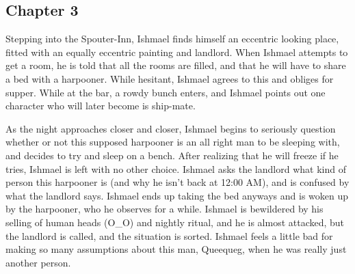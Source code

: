 \subsection{Chapter 3}

Stepping into the Spouter-Inn, Ishmael finds himself an eccentric looking
place, fitted with an equally eccentric painting and landlord. When Ishmael
attempts to get a room, he is told that all the rooms are filled, and that he
will have to share a bed with a harpooner. While hesitant, Ishmael agrees to
this and obliges for supper. While at the bar, a rowdy bunch enters, and
Ishmael points out one character who will later become is ship-mate.

As the night approaches closer and closer, Ishmael begins to seriously
question whether or not this supposed harpooner is an all right man to be
sleeping with, and decides to try and sleep on a bench. After realizing that he
will freeze if he tries, Ishmael is left with no other choice. Ishmael asks
the landlord what kind of person this harpooner is (and why he isn't back at
12:00 AM), and is confused by what the landlord says. Ishmael ends up taking
the bed anyways and is woken up by the harpooner, who he observes for a while.
Ishmael is bewildered by his selling of human heads (O\_O) and nightly ritual,
and he is almost attacked, but the landlord is called, and the situation is
sorted. Ishmael feels a little bad for making so many assumptions about this
man, Queequeg, when he was really just another person.
